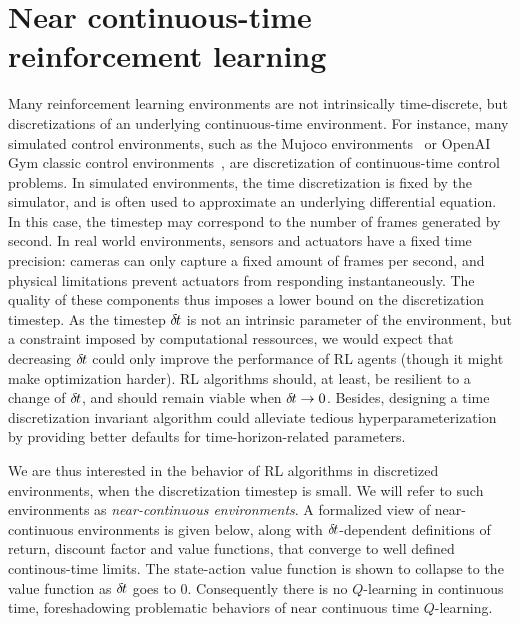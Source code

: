 \section{Near continuous-time reinforcement learning}
\label{sec:framework}

Many reinforcement learning environments are not intrinsically
time-discrete, but discretizations of an underlying continuous-time
environment. For instance, many simulated control environments, such as
the Mujoco environments~\cite{ddpg} or OpenAI Gym classic control
environments~\cite{gym}, are discretization of continuous-time control
problems.  In simulated environments, the time discretization is fixed by
the simulator, and is often used to approximate an underlying
differential equation.  In this case, the timestep may correspond to the
number of frames generated by second.  In real world environments,
sensors and actuators have a fixed time precision: cameras can only
capture a fixed amount of frames per second, and physical limitations
prevent actuators from responding instantaneously. The quality of these
components thus imposes a lower bound on the discretization timestep. As
the timestep ${\delta\hspace{-.1em}t}$ is not an intrinsic parameter of the
environment, but a constraint imposed by computational ressources, we
would expect that decreasing ${\delta\hspace{-.1em}t}$ could only improve the performance
of RL agents (though it might make optimization
harder).  RL algorithms should, at least, be resilient to a change of
${\delta\hspace{-.1em}t}$, and should remain viable when ${\delta\hspace{-.1em}t} \rightarrow 0$.
Besides, designing a time discretization invariant algorithm could
alleviate tedious hyperparameterization by providing better defaults for
time-horizon-related parameters.

We are thus interested in the behavior of RL
algorithms in discretized environments, when the discretization timestep
is small. We will refer to such environments as \emph{near-continuous
environments}.
A formalized view of near-continuous environments is
given below, along with ${\delta\hspace{-.1em}t}$-dependent definitions of return, discount
factor and value functions, that converge to well defined
continous-time limits. The state-action value
function is shown to collapse to the value function as ${\delta\hspace{-.1em}t}$ goes to $0$.
Consequently there is no $Q$-learning in continuous time, foreshadowing
problematic behaviors of near continuous time $Q$-learning.

